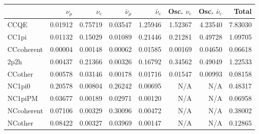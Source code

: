 

\begin{table}
	\centering
	\begin{tabular} { | l ||r | r | r | r | r | r | | r | }
	\hline
	              & $\nu_\mu$            & $\nu_e$              & $\bar{\nu}_{\mu}$    & $\bar{\nu}_{e}$      & Osc. $\nu_e$         & Osc. $\bar{\nu}_{e}$ & Total                \\ \hline\hline
	 CCQE         & 0.01912              & 0.75719              & 0.03547              & 1.25946              & 1.52367              & 4.23540              & 7.83030              \\ \hline
	 CC1pi        & 0.01132              & 0.15029              & 0.01089              & 0.21446              & 0.21281              & 0.49728              & 1.09705              \\ \hline
	 CCcoherent   & 0.00004              & 0.00148              & 0.00062              & 0.01585              & 0.00169              & 0.04650              & 0.06618              \\ \hline
	 2p2h         & 0.00437              & 0.21366              & 0.00326              & 0.16792              & 0.34562              & 0.49049              & 1.22533              \\ \hline
	 CCother      & 0.00578              & 0.03146              & 0.00178              & 0.01716              & 0.01547              & 0.00993              & 0.08158              \\ \hline
	 NC1pi0       & 0.20578              & 0.00804              & 0.26242              & 0.00695              & N/A                  & N/A                  & 0.48317              \\ \hline
	 NC1piPM      & 0.03677              & 0.00189              & 0.02971              & 0.00120              & N/A                  & N/A                  & 0.06958              \\ \hline
	 NCcoherent   & 0.07106              & 0.00329              & 0.30096              & 0.00472              & N/A                  & N/A                  & 0.38002              \\ \hline
	 NCother      & 0.08422              & 0.00327              & 0.03969              & 0.00147              & N/A                  & N/A                  & 0.12865              \\ \hline

\end{tabular}
\end{table}
